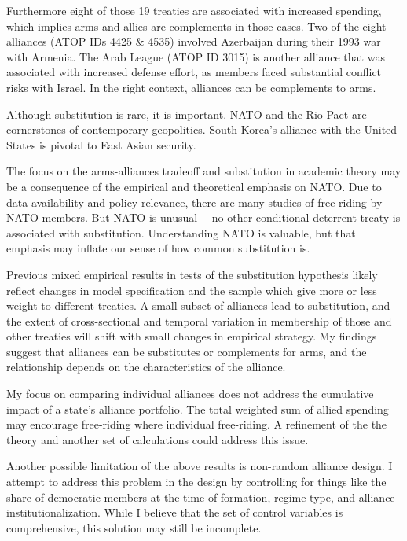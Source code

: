 \documentclass[12pt]{article}
\begin{document}
Furthermore eight of those 19 treaties are associated with increased spending, which implies arms and allies are complements in those cases. Two of the eight alliances (ATOP IDs 4425 \& 4535) involved Azerbaijan during their 1993 war with Armenia. The Arab League (ATOP ID 3015) is another alliance that was associated with increased defense effort, as members faced substantial conflict risks with Israel. In the right context, alliances can be complements to arms. 

Although substitution is rare, it is important. NATO and the Rio Pact are cornerstones of contemporary geopolitics. South Korea's alliance with the United States is pivotal to East Asian security. 

The focus on the arms-alliances tradeoff and substitution in academic theory may be a consequence of the empirical and theoretical emphasis on NATO. Due to data availability and policy relevance, there are many studies of free-riding by NATO members. But NATO is unusual--- no other conditional deterrent treaty is associated with substitution. Understanding NATO is valuable, but that emphasis may inflate our sense of how common substitution is. 

Previous mixed empirical results in tests of the substitution hypothesis likely reflect changes in model specification and the sample which give more or less weight to different treaties. A small subset of alliances lead to substitution, and the extent of cross-sectional and temporal variation in membership of those and other treaties will shift with small changes in empirical strategy. My findings suggest that alliances can be substitutes or complements for arms, and the relationship depends on the characteristics of the alliance. 

My focus on comparing individual alliances does not address the cumulative impact of a state's alliance portfolio. The total weighted sum of allied spending may encourage free-riding where individual free-riding. A refinement of the the theory and another set of calculations could address this issue.  

Another possible limitation of the above results is non-random alliance design. I attempt to address this problem in the design by controlling for things like the share of democratic members at the time of formation, regime type, and alliance institutionalization. While I believe that the set of control variables is comprehensive, this solution may still be incomplete. 
\end{document}
